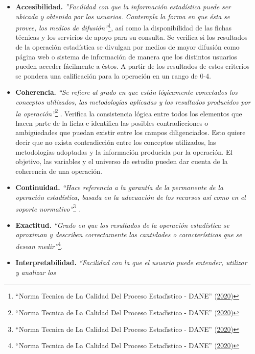 \documentclass[
]{book}
\begin{document}
\begin{itemize}
  \begin{itemize}
  \item
    \textbf{Accesibilidad.} \emph{''Facilidad con que la información estadística puede ser ubicada y obtenida por los usuarios. Contempla la forma en que ésta se
    provee, los medios de difusión''}\footnote{{``Norma Tecnica de La Calidad Del Proceso Estad{ı́}stico - DANE''} (\protect\hyperlink{ref-BibEntry2020Oct}{2020})}, así como la
    disponibilidad de las fichas técnicas y los servicios
    de apoyo para su consulta. Se verifica si los
    resultados de la operación estadística se divulgan
    por medios de mayor difusión como página web o
    sistema de información de manera que los distintos
    usuarios pueden acceder fácilmente a éstos. A partir de los resultados de estos criterios se pondera una
    calificación para la operación en un rango de
    0-4.
  \item
    \textbf{Coherencia.} \emph{``Se refiere al grado en que están
    lógicamente conectados los conceptos utilizados,
    las metodologías aplicadas y los resultados
    producidos por la operación''}\footnote{{``Norma Tecnica de La Calidad Del Proceso Estad{ı́}stico - DANE''} (\protect\hyperlink{ref-BibEntry2020Oct}{2020})} . Verifica la
    consistencia lógica entre todos los elementos que
    hacen parte de la ficha e identifica las posibles
    contradicciones o ambigüedades que puedan existir
    entre los campos diligenciados. Esto quiere
    decir que no exista contradicción entre los conceptos
    utilizados, las metodologías adoptadas y la
    información producida por la operación. El objetivo,
    las variables y el universo de estudio pueden
    dar cuenta de la coherencia de una operación.
  \item
    \textbf{Continuidad.} \emph{``Hace referencia a la garantía de la permanente de la operación estadística, basada en la adecuación de los recursos así como en el soporte
    normativo''}\footnote{{``Norma Tecnica de La Calidad Del Proceso Estad{ı́}stico - DANE''} (\protect\hyperlink{ref-BibEntry2020Oct}{2020})} .
  \item
    \textbf{Exactitud.} \emph{``Grado en que los resultados de la
    operación estadística se aproximan y describen
    correctamente las cantidades o características que se
    desean medir''}\footnote{{``Norma Tecnica de La Calidad Del Proceso Estad{ı́}stico - DANE''} (\protect\hyperlink{ref-BibEntry2020Oct}{2020})}.
  \item
    \textbf{Interpretabilidad.} \emph{``Facilidad con la que el
    usuario puede entender, utilizar y analizar los
}
\end{itemize}
\end{itemize}
\end{document}
